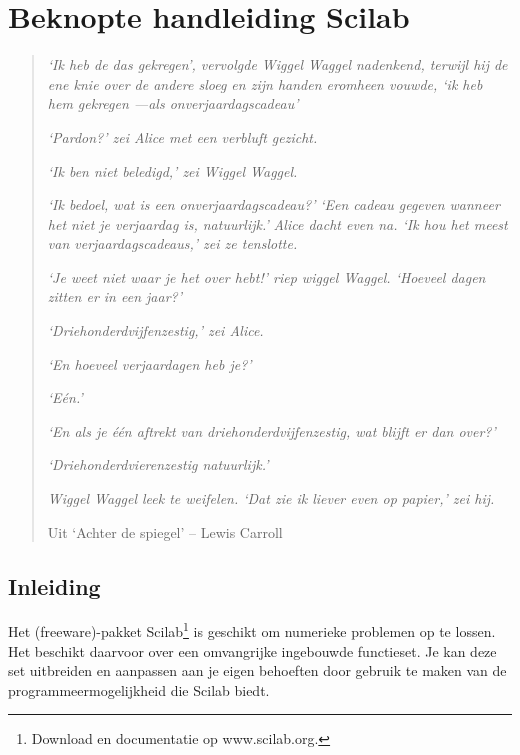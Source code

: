 
\chapter{Beknopte handleiding Scilab}
\label{scilab}
\begin{quote}
     \textit{{\small `Ik heb de das gekregen', vervolgde Wiggel 
Waggel nadenkend, terwijl hij de ene knie over de andere sloeg en 
zijn handen eromheen vouwde, `ik heb hem gekregen ---als 
onverjaardagscadeau'}}

     \textit{{\small `Pardon?' zei Alice met een verbluft gezicht.}}

     \textit{{\small `Ik ben niet beledigd,' zei Wiggel Waggel.}}

     \textit{{\small `Ik bedoel, wat is een onverjaardagscadeau?'}}
     \textit{{\small `Een cadeau gegeven wanneer het niet je verjaardag is, natuurlijk.'}}
	\textit{{\small Alice dacht even na. `Ik hou het meest van verjaardagscadeaus,' zei ze tenslotte.}}
	
	
\textit{{\small `Je weet niet waar je het over hebt!' riep wiggel 
Waggel. `Hoeveel dagen zitten er in een jaar?'}}
	
	\textit{{\small 
`Driehonderdvijfenzestig,' zei Alice.}}
			
	\textit{{\small `En 
hoeveel verjaardagen heb je?'}}
	
	\textit{{\small `E\'{e}n.'}}
	
	
\textit{{\small `En als je \'{e}\'{e}n aftrekt van 
driehonderdvijfenzestig, wat blijft er dan over?'}}
	
	
\textit{{\small `Driehonderdvierenzestig natuurlijk.'}}
	
		
\textit{{\small Wiggel Waggel leek te weifelen. `Dat zie ik liever 
even op papier,' zei hij.}}
		
          Uit `Achter de spiegel' -- Lewis Carroll
\end{quote}

\newpage

\section{Inleiding}

Het (freeware)-pakket Scilab\footnote{Download en documentatie op www.scilab.org.} is geschikt om numerieke problemen op te lossen. Het beschikt daarvoor over een omvangrijke ingebouwde functieset. Je kan deze set uitbreiden en aanpassen aan je eigen behoeften door gebruik te maken van de programmeermogelijkheid die Scilab biedt.

